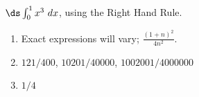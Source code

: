 {$\ds \int_{0}^1 x^3\ dx$, using the Right Hand Rule.
}
{\begin{enumerate}
\item		Exact expressions will vary; $\frac{(1+n)^2}{4n^2}$.
\item		$121/400$, $10201/40000$, $1002001/4000000$
\item		$1/4$
\end{enumerate}
}

